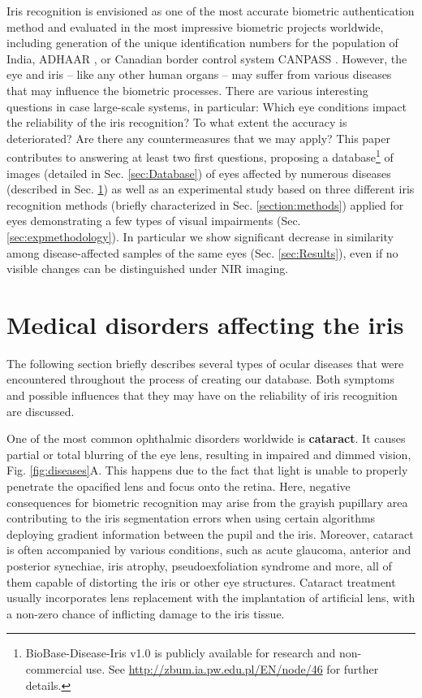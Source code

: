 \documentclass[conference]{IEEEtran}
\begin{document}
Iris recognition is envisioned as one of the most accurate biometric authentication method and evaluated in the most impressive biometric projects worldwide, including generation of the unique identification numbers for the population of India, ADHAAR \cite{AADHAAR}, or Canadian border control system CANPASS \cite{CBSA}. However, the eye and iris -- like any other human organs -- may suffer from various diseases that may influence the biometric processes. There are various interesting questions in case large-scale systems, in particular: Which eye conditions impact the reliability of the iris recognition? To what extent the accuracy is deteriorated? Are there any countermeasures that we may apply? This paper contributes to answering at least two first questions, proposing a database\footnote{BioBase-Disease-Iris v1.0 is publicly available for research and non-commercial use. See \url{http://zbum.ia.pw.edu.pl/EN/node/46} for further details.} of images (detailed in Sec. \ref{sec:Database}) of eyes affected by numerous diseases (described in Sec. \ref{section:medical}) as well as an experimental study based on three different iris recognition methods (briefly characterized in Sec. \ref{section:methods}) applied for eyes demonstrating a few types of visual impairments (Sec. \ref{sec:expmethodology}). In particular we show significant decrease in similarity among disease-affected samples of the same eyes (Sec. \ref{sec:Results}), even if no visible changes can be distinguished under NIR imaging. 


\section{Medical disorders affecting the iris}
\label{section:medical}

The following section briefly describes several types of ocular diseases that were encountered throughout the process of creating our database. Both symptoms and possible influences that they may have on the reliability of iris recognition are discussed.

One of the most common ophthalmic disorders worldwide is \textbf{cataract}. It causes partial or total blurring of the eye lens, resulting in impaired and dimmed vision, Fig. \ref{fig:diseases}A. This happens due to the fact that light is unable to properly penetrate the opacified lens and focus onto the retina. Here, negative consequences for biometric recognition may arise from the grayish pupillary area contributing to the iris segmentation errors when using certain algorithms deploying gradient information between the pupil and the iris. Moreover, cataract is often accompanied by various conditions, such as acute glaucoma, anterior and posterior synechiae, iris atrophy, pseudoexfoliation syndrome and more, all of them capable of distorting the iris or other eye structures. Cataract treatment usually incorporates lens replacement with the implantation of artificial lens, with a non-zero chance of inflicting damage to the iris tissue.
\end{document}
